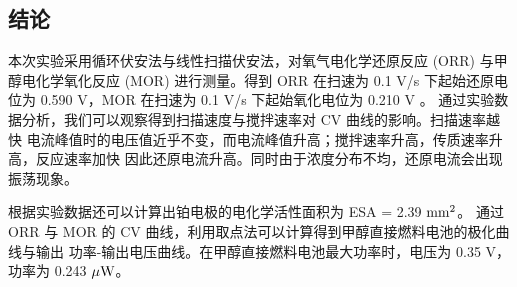 \documentclass[cn,hazy,pku,12pt,normal,math=newtx,cite=super]{elegantnote}
\begin{document}
\subsection{结论}

    本次实验采用循环伏安法与线性扫描伏安法，对氧气电化学还原反应 (ORR) 与甲醇电化学氧化反应 (MOR) 
进行测量。得到 ORR 在扫速为 0.1 V/s 下起始还原电位为 0.590 V，MOR 在扫速为 0.1 V/s 下起始氧化电位为 0.210 V
。
通过实验数据分析，我们可以观察得到扫描速度与搅拌速率对 CV 曲线的影响。扫描速率越快
电流峰值时的电压值近乎不变，而电流峰值升高；搅拌速率升高，传质速率升高，反应速率加快
因此还原电流升高。同时由于浓度分布不均，还原电流会出现振荡现象。

根据实验数据还可以计算出铂电极的电化学活性面积为 ESA = 2.39 $\rm mm^2$。
通过 ORR 与 MOR 的 CV 曲线，利用取点法可以计算得到甲醇直接燃料电池的极化曲线与输出
功率-输出电压曲线。在甲醇直接燃料电池最大功率时，电压为 0.35 V，
功率为 0.243 $\rm \mu W$。


\nocite{*}

\end{document}

